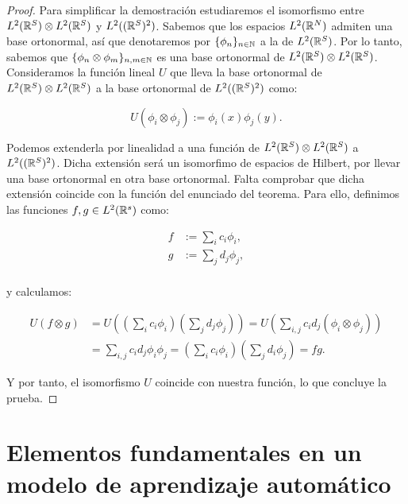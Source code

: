 \begin{proof}

    Para simplificar la demostración estudiaremos el isomorfismo entre $L^2(\mathbb{R}^S) \otimes L^2(\mathbb{R}^S)$ y $L^2((\mathbb{R}^S)^2)$. Sabemos que los espacios $L^2(\mathbb{R}^N)$ admiten una base ortonormal, así que denotaremos por $\{ \phi_n \}_{n \in \mathbb{N}}$ a la de $L^2(\mathbb{R}^S)$. Por lo tanto, sabemos que $\{ \phi_n \otimes \phi_m \}_{n, m \in \mathbb{N}}$ es una base ortonormal de $L^2(\mathbb{R}^S) \otimes L^2(\mathbb{R}^S)$. Consideramos la función lineal $U$ que lleva la base ortonormal de $L^2(\mathbb{R}^S) \otimes L^2(\mathbb{R}^S)$ a la base ortonormal de $L^2((\mathbb{R}^S)^2)$ como:

    \begin{equation}
        U(\phi_i \otimes \phi_j) := \phi_i(x) \phi_j(y).
    \end{equation}

    Podemos extenderla por linealidad a una función de $L^2(\mathbb{R}^S) \otimes L^2(\mathbb{R}^S)$ a $L^2((\mathbb{R}^S)^2)$. Dicha extensión será un isomorfimo de espacios de Hilbert, por llevar una base ortonormal en otra base ortonormal. Falta comprobar que dicha extensión coincide con la función del enunciado del teorema. Para ello, definimos las funciones $f, g \in L^2(\mathbb{R}^s)$ como:

    \begin{equation}
    \begin{split}
        f &:= \sum_i c_i \phi_i, \\
        g &:= \sum_j d_j \phi_j, \\
    \end{split}
    \end{equation}

    y calculamos:

    \begin{equation}
    \begin{split}
        U(f \otimes g) &= U((\sum_i c_i \phi_i) (\sum_j d_j \phi_j)) = U(\sum_{i, j} c_i d_j (\phi_i \otimes \phi_j)) \\
        &= \sum_{i, j} c_i d_j \phi_i \phi_j = (\sum_i c_i \phi_i) (\sum_j d_i \phi_j) = f g.
    \end{split}
    \end{equation}

    Y por tanto, el isomorfismo $U$ coincide con nuestra función, lo que concluye la prueba.

\end{proof}

\section{Elementos fundamentales en un modelo de aprendizaje automático} \label{sec:piezas_machine_learning_matematicas}

